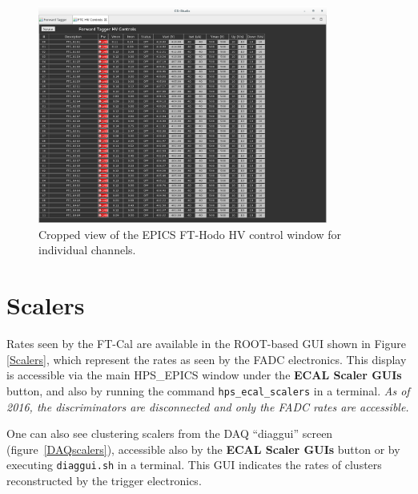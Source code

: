\documentclass[12pt]{article}
\begin{document}
\begin{figure}[htbp]
\center
\includegraphics[width=0.85\textwidth]{Images/FTC_HV_controls_expert.png}
\caption{ \label{HVControl} Cropped view of the EPICS FT-Hodo HV control window for individual channels.}
\end{figure}



\clearpage

\newpage
      \section{Scalers}

      Rates seen by the FT-Cal are available in the ROOT-based GUI shown in Figure \ref{Scalers}, which represent the rates as seen by the FADC electronics.  This display is accessible via the main HPS\_EPICS window under the {\bf ECAL Scaler GUIs} button, and also by running the command \texttt{hps\_ecal\_scalers} in a terminal.  {\em As of 2016, the discriminators are disconnected and only the FADC rates are accessible.}
      
      One can also see clustering scalers from the DAQ ``diaggui'' screen (figure~\ref{DAQscalers}), accessible also by the {\bf ECAL Scaler GUIs} button or by executing \texttt{diaggui.sh} in a terminal.  This GUI indicates the rates of clusters reconstructed by the trigger electronics. 
      
\end{document}
